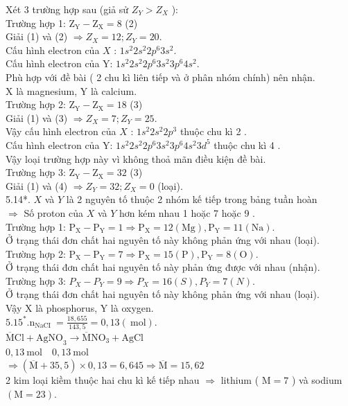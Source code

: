 \documentclass[10pt]{article}
\begin{document}
Xét 3 trường hợp sau (giả sử $Z_{Y}>Z_{X}$ ):\\
Trường hợp 1: $\mathrm{Z}_{\mathrm{Y}}-\mathrm{Z}_{\mathrm{X}}=8$ (2)\\
Giải (1) và (2) $\Rightarrow Z_{X}=12 ; Z_{Y}=20$.\\
Cấu hình electron của $X$ : $1 s^{2} 2 s^{2} 2 p^{6} 3 s^{2}$.\\
Cấu hình electron của Y: $1 s^{2} 2 s^{2} 2 p^{6} 3 s^{2} 3 p^{6} 4 s^{2}$.\\
Phù hợp với đề bài ( 2 chu kì liên tiếp và ở phân nhóm chính) nên nhận.\\
X là magnesium, Y là calcium.\\
Trường hợp 2: $\mathrm{Z}_{\mathrm{Y}}-\mathrm{Z}_{\mathrm{X}}=18$ (3)\\
Giải (1) và (3) $\Rightarrow Z_{X}=7 ; Z_{Y}=25$.\\
Vậy cấu hình electron của $X$ : $1 s^{2} 2 s^{2} 2 p^{3}$ thuộc chu kì 2 .\\
Cấu hình electron của Y: $1 s^{2} 2 s^{2} 2 p^{6} 3 s^{2} 3 p^{6} 4 s^{2} 3 d^{5}$ thuộc chu kì 4 .\\
Vậy loại trường hợp này vì không thoả mãn điều kiện đề bài.\\
Trường hợp 3: $\mathrm{Z}_{\mathrm{Y}}-\mathrm{Z}_{\mathrm{X}}=32$ (3)\\
Giải (1) và (4) $\Rightarrow Z_{Y}=32 ; Z_{X}=0$ (loại).\\
5.14*. $X$ và $Y$ là 2 nguyên tố thuộc 2 nhóm kế tiếp trong bảng tuần hoàn\\
$\Rightarrow$ Số proton của $X$ và $Y$ hơn kém nhau 1 hoặc 7 hoặc 9 .\\
Trường hợp 1: $\mathrm{P}_{\mathrm{X}}-\mathrm{P}_{\mathrm{Y}}=1 \Rightarrow \mathrm{P}_{\mathrm{X}}=12(\mathrm{Mg}), \mathrm{P}_{\mathrm{Y}}=11(\mathrm{Na})$.\\
Ở trạng thái đơn chất hai nguyên tố này không phản ứng với nhau (loại).\\
Trường hợp 2: $\mathrm{P}_{\mathrm{X}}-\mathrm{P}_{\mathrm{Y}}=7 \Rightarrow \mathrm{P}_{\mathrm{X}}=15(\mathrm{P}), \mathrm{P}_{\mathrm{Y}}=8(\mathrm{O})$.\\
Ở trạng thái đơn chất hai nguyên tố này phản ứng được với nhau (nhận).\\
Trường hợp 3: $P_{X}-P_{Y}=9 \Rightarrow P_{X}=16(S), P_{Y}=7(N)$.\\
Ở trạng thái đơn chất hai nguyên tố này không phản ứng với nhau (loại).\\
Vậy X là phosphorus, Y là oxygen.\\
$5.15^{*} . \mathrm{n}_{\text {NaCI }}=\frac{18,655}{143,5}=0,13(\mathrm{~mol})$.\\
$\overline{\mathrm{M}} \mathrm{Cl}+\mathrm{AgNO}_{3} \rightarrow \overline{\mathrm{M}} \mathrm{NO}_{3}+\mathrm{AgCl}$\\
$0,13 \mathrm{~mol} \quad 0,13 \mathrm{~mol}$\\
$\Rightarrow(\overline{\mathrm{M}}+35,5) \times 0,13=6,645 \Rightarrow \overline{\mathrm{M}}=15,62$\\
2 kim loại kiềm thuộc hai chu kì kế tiếp nhau $\Rightarrow$ lithium ( $\mathrm{M}=7$ ) và sodium $(\mathrm{M}=23)$.
\end{document}
